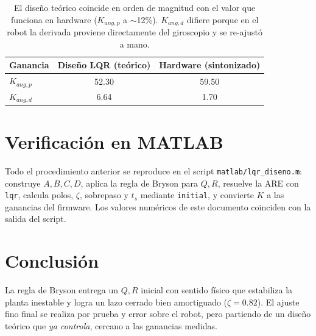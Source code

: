\documentclass[11pt,a4paper]{article}
\begin{document}
\begin{table}[h]\centering
\begin{tabular}{lcc}
\toprule
Ganancia & Dise\~no LQR (te\'orico) & Hardware (sintonizado) \\
\midrule
$K_{ang,p}$ & 52.30 & 59.50 \\
$K_{ang,d}$ & 6.64  & 1.70 \\
\bottomrule
\end{tabular}
\caption{El dise\~no te\'orico coincide en orden de magnitud con el valor que
funciona en hardware ($K_{ang,p}$ a $\sim$12\%). $K_{ang,d}$ difiere porque en el
robot la derivada proviene directamente del giroscopio y se re-ajust\'o a mano.}
\end{table}

\section{Verificaci\'on en MATLAB}
Todo el procedimiento anterior se reproduce en el script
\texttt{matlab/lqr\_diseno.m}: construye $A,B,C,D$, aplica la regla de Bryson
para $Q,R$, resuelve la ARE con \texttt{lqr}, calcula polos, $\zeta$, sobrepaso y
$t_s$ mediante \texttt{initial}, y convierte $K$ a las ganancias del firmware.
Los valores num\'ericos de este documento coinciden con la salida del script.

\section{Conclusi\'on}
La regla de Bryson entrega un $Q,R$ inicial con sentido f\'isico que estabiliza
la planta inestable y logra un lazo cerrado bien amortiguado ($\zeta=0.82$). El
ajuste fino final se realiza por prueba y error sobre el robot, pero partiendo de
un dise\~no te\'orico que \emph{ya controla}, cercano a las ganancias medidas.
\end{document}

